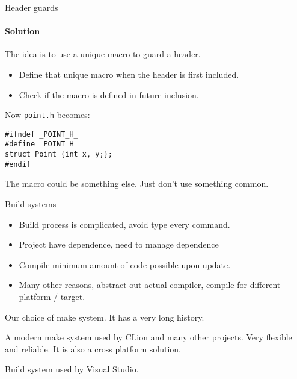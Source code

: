 \begin{frame}[fragile]{Header guards}
\framesubtitle{Solution}
The idea is to use a unique macro to guard a header.
\begin{itemize}
	\item Define that unique macro when the header is first included.
	\item Check if the macro is defined in future inclusion.
\end{itemize}

Now \texttt{point.h} becomes:

\begin{verbatim} 
#ifndef _POINT_H_
#define _POINT_H_
struct Point {int x, y;};
#endif
\end{verbatim}

The macro could be something else. Just don't use something common.

\end{frame}

\begin{frame}{Build systems}
\begin{itemize}
	\item Build process is complicated, avoid type every command.
	\item Project have dependence, need to manage dependence
	\item Compile minimum amount of code possible upon update.
	\item Many other reasons, abstract out actual compiler, compile for different platform / target.
\end{itemize}
\begin{description}
	\item[GNU/make] Our choice of make system. It has a very long history.
	\item[CMake] A modern make system used by CLion and many other projects. Very flexible and reliable. It is also a cross platform solution.
	\item[MSBuild] Build system used by Visual Studio.
\end{description}
\end{frame}

